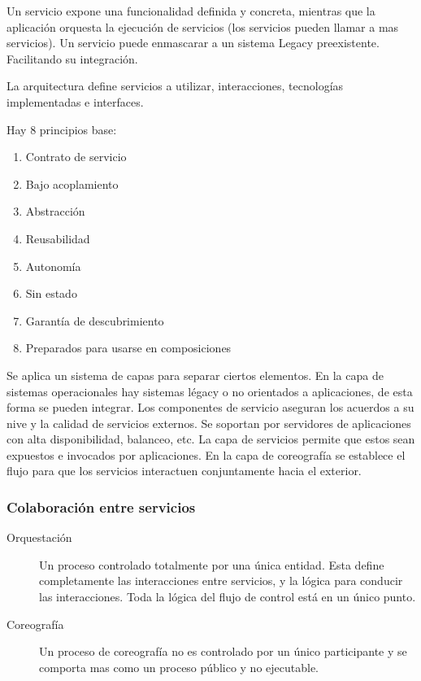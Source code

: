 Un servicio expone una funcionalidad definida y concreta, mientras que la aplicación orquesta la ejecución de servicios (los servicios pueden llamar a mas servicios). Un servicio puede enmascarar a un sistema Legacy preexistente. Facilitando su integración.

La arquitectura define servicios a utilizar, interacciones, tecnologías implementadas e interfaces.

Hay 8 principios base:

\begin{enumerate}
    \item Contrato de servicio
    \item Bajo acoplamiento
    \item Abstracción
    \item Reusabilidad
    \item Autonomía
    \item Sin estado
    \item Garantía de descubrimiento
    \item Preparados para usarse en composiciones
\end{enumerate}

Se aplica un sistema de capas para separar ciertos elementos. En la capa de sistemas operacionales hay sistemas légacy o no orientados a aplicaciones, de esta forma se pueden integrar. Los componentes de servicio aseguran los acuerdos a su nive y la calidad de servicios externos. Se soportan por servidores de aplicaciones con alta disponibilidad, balanceo, etc. La capa de servicios permite que estos sean expuestos e invocados por aplicaciones. En la capa de coreografía se establece el flujo para que los servicios interactuen conjuntamente hacia el exterior.

\subsubsection{Colaboración entre servicios}

\begin{description}
    \item[Orquestación] Un proceso controlado totalmente por una única entidad. Esta define completamente las interacciones entre servicios, y la lógica para conducir las interacciones. Toda la lógica del flujo de control está en un único punto.
    \item[Coreografía] Un proceso de coreografía no es controlado por un único participante y se comporta mas como un proceso público y no ejecutable.
\end{description}

